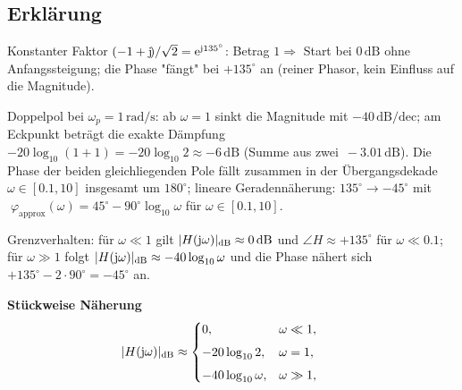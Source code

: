 \subsection{Erklärung}
\vspace{5mm}
\begin{description}[leftmargin=1.2em,labelsep=.6em,font=\bfseries]
\item[Schritt 1] Konstanter Faktor $(-1+\operatorname{j}\!)/\sqrt{2}=\mathrm{e}^{\operatorname{j}\!135^\circ}$: Betrag $1\Rightarrow$ Start bei $0\,\mathrm{dB}$ ohne Anfangssteigung; die Phase "fängt" bei $+135^\circ$ an (reiner Phasor, kein Einfluss auf die Magnitude).
\item[Schritt 2] Doppelpol bei $\omega_p=1\,\mathrm{rad/s}$: ab $\omega=1$ sinkt die Magnitude mit $-40\,\mathrm{dB/dec}$; am Eckpunkt beträgt die exakte Dämpfung $-20\log_{10}(1+1)= -20\log_{10}2\approx-6\,\mathrm{dB}$ (Summe aus zwei $\,-3.01\,\mathrm{dB}$). Die Phase der beiden gleichliegenden Pole fällt zusammen in der Übergangsdekade $\omega\in[0.1,10]$ insgesamt um $180^\circ$; lineare Geradennäherung: $135^\circ\to-45^\circ$ mit $\;\varphi_{\text{approx}}(\omega)=45^\circ-90^\circ\log_{10}\omega$ für $\omega\in[0.1,10]$.
\item[Schritt 3] Grenzverhalten: für $\omega\ll1$ gilt $|H(\operatorname{j}\!\omega)|_{\mathrm{dB}}\approx0\,\mathrm{dB}$ und $\angle H\approx+135^\circ$ für $\omega\ll0.1$; für $\omega\gg1$ folgt $|H(\operatorname{j}\!\omega)|_{\mathrm{dB}}\approx-40\log_{10}\omega$ und die Phase nähert sich $+135^\circ-2\cdot90^\circ=-45^\circ$ an.
\end{description}

\vspace{0.5cm}
\medskip
\noindent\textbf{Stückweise Näherung}
\[
|H(\operatorname{j}\!\omega)|_{\mathrm{dB}}\approx
\begin{cases}
0,& \omega\ll1,\\[4pt]
-20\log_{10}2,& \omega=1,\\[4pt]
-40\log_{10}\omega,& \omega\gg1,
\end{cases}
\qquad
\]
\newpage